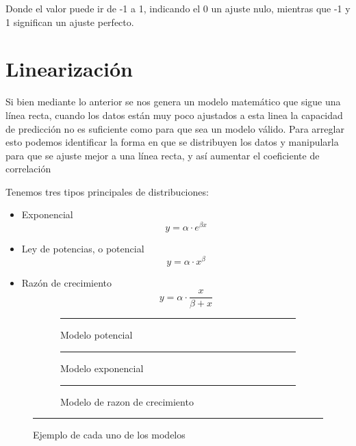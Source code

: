 Donde el valor puede ir de -1 a 1, indicando el 0 un ajuste nulo, mientras que -1 y 1 significan un ajuste perfecto.

\section{Linearización}

Si bien mediante lo anterior se nos genera un modelo matemático que sigue una línea recta, cuando los datos están muy poco ajustados a esta linea la capacidad de predicción no es suficiente como para que sea un modelo válido. Para arreglar esto podemos identificar la forma en que se distribuyen los datos y manipularla para que se ajuste mejor a una línea recta, y así aumentar el coeficiente de correlación

Tenemos tres tipos principales de distribuciones:

\begin{itemize}
    \item Exponencial
    \begin{equation}
        y = \alpha \cdot e^{\beta x}
    \end{equation}

    \item Ley de potencias, o potencial
    \begin{equation}
        y = \alpha \cdot x^{\beta}
    \end{equation}

    \item Razón de crecimiento
    \begin{equation}
        y = \alpha \cdot \frac{x}{\beta + x}
    \end{equation}
\end{itemize}

\begin{figure}\centering
    \begin{subfigure}[b]{0.3\linewidth}
        \centering
        \resizebox{\linewidth}{!}{}
        \rule{\linewidth}{0.5pt}
        \caption{Modelo potencial}
        \label{fig:modelo_potencial}
    \end{subfigure}
    \hfill
    \begin{subfigure}[b]{0.3\linewidth}\centering
        \resizebox{\linewidth}{!}{}
        \rule{\linewidth}{0.5pt}
        \caption{Modelo exponencial}
        \label{fig:modelo_exponencial}
    \end{subfigure}
    \hfill
    \begin{subfigure}[b]{0.3\linewidth}\centering
        \resizebox{\linewidth}{!}{}
        \rule{\linewidth}{0.5pt}
        \caption{Modelo de razon de crecimiento}
        \label{fig:modelo_razon_de_crecimiento}
    \end{subfigure}
    
    \rule{\linewidth}{0.5pt}
    \caption{Ejemplo de cada uno de los modelos}
    \label{fig:modelos}
\end{figure}

